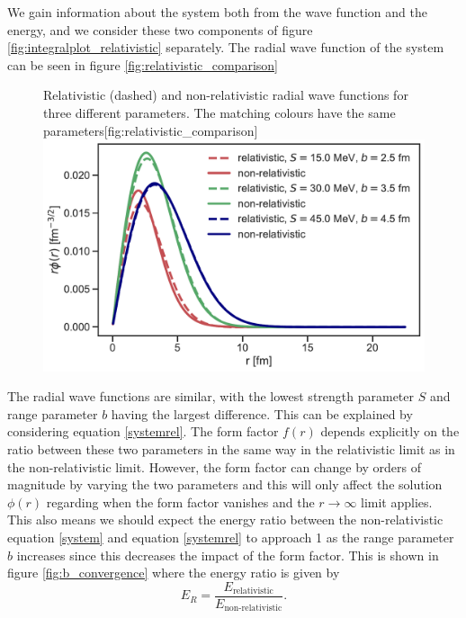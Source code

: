 We gain information about the system both from the wave function and the energy, and we consider these two components of figure \ref{fig:integralplot_relativistic} separately. The radial wave function of the system can be seen in figure \ref{fig:relativistic_comparison}
\begin{figure}[H]
	\begin{sidecaption}{Relativistic (dashed) and non-relativistic radial wave functions for three different parameters. The matching colours have the same parameters}[fig:relativistic_comparison]
		\includegraphics[width=\linewidth]{Figures/rela_vs_nonrela_radial.pdf}
	\end{sidecaption}
\end{figure}
The radial wave functions are similar, with the lowest strength parameter $S$ and range parameter $b$ having the largest difference. This can be explained by considering equation \eqref{systemrel}. The form factor $f(r)$ depends explicitly on the ratio between these two parameters in the same way in the relativistic limit as in the non-relativistic limit. However, the form factor can change by orders of magnitude by varying the two parameters and this will only affect the solution $\phi(r)$ regarding when the form factor vanishes and the $r\rightarrow \infty$ limit applies. This also means we should expect the energy ratio between the non-relativistic equation \eqref{system} and equation \eqref{systemrel} to approach 1 as the range parameter $b$ increases since this decreases the impact of the form factor. This is shown in figure \ref{fig:b_convergence} where the energy ratio is given by
\begin{equation} \label{energyratio}
	E_R = \frac{E_\text{relativistic}}{E_\text{non-relativistic}}.
\end{equation}
